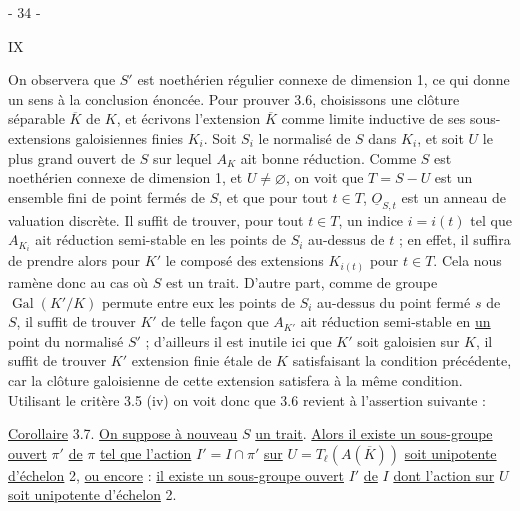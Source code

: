 \begin{center}- 34 -\end{center}\hfill IX

On observera que $S'$ est noethérien régulier connexe de dimension 1, ce qui donne un sens à la conclusion énoncée. Pour prouver 3.6, choisissons une clôture séparable $\overline K$ de $K$, et écrivons l'extension $\overline K$ comme limite inductive de ses sous-extensions galoisiennes finies $K_i$. Soit $S_i$ le normalisé de $S$ dans $K_i$, et soit $U$ le plus grand ouvert de $S$ sur lequel $A_K$ ait bonne réduction. Comme $S$ est noethérien connexe de dimension 1, et $U\ne\varnothing$, on voit que $T=S-U$ est un ensemble fini de point fermés de $S$, et que pour tout $t\in T$, $\underline O_{S,t}$ est un anneau de valuation discrète. Il suffit de trouver, pour tout $t\in T$, un indice $i=i(t)$ tel que $A_{K_i}$ ait réduction semi-stable en les points de $S_i$ au-dessus de $t$ ; en effet, il suffira de prendre alors pour $K'$ le composé des extensions $K_{i(t)}$ pour $t\in T$. Cela nous ramène donc au cas où $S$ est un trait. D'autre part, comme de groupe $\operatorname{Gal}(K'/K)$ permute entre eux les points de $S_i$ au-dessus du point fermé $s$ de $S$, il suffit de trouver $K'$ de telle façon que $A_{K'}$ ait réduction semi-stable en \uline{un} point du normalisé $S'$ ; d'ailleurs il est inutile ici que $K'$ soit galoisien sur $K$, il suffit de trouver $K'$ extension finie étale de $K$ satisfaisant la condition précédente, car la clôture galoisienne de cette extension satisfera à la même condition. Utilisant le critère 3.5 (iv) on voit donc que 3.6 revient à l'assertion suivante :

\uline{Corollaire} 3.7. \uline{On suppose à nouveau} $S$ \uline{un trait}. \uline{Alors il existe un sous-groupe ouvert} $\pi'$ \uline{de} $\pi$ \uline{tel que l'action} $I'=I\cap\pi'$ \uline{sur} $U=T_\ell(A(\overline K))$ \uline{soit unipotente d'échelon} 2, \uline{ou encore} : \uline{il existe un sous-groupe ouvert} $I'$ \uline{de} $I$ \uline{dont l'action sur} $U$ \uline{soit unipotente d'échelon} 2.

